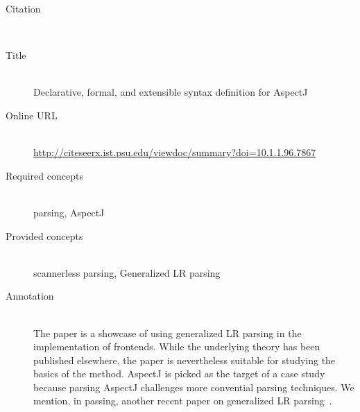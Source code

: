 \begin{description}
\item[Citation]\mbox{}\\
\cite{BravenboerTV06}
\item[Title]\mbox{}\\
Declarative, formal, and extensible syntax definition for AspectJ
\item[Online URL]\mbox{}\\
{\footnotesize\url{http://citeseerx.ist.psu.edu/viewdoc/summary?doi=10.1.1.96.7867}}
\item[Required concepts]\mbox{}\\
parsing, AspectJ\item[Provided concepts]\mbox{}\\
scannerless parsing, Generalized LR parsing\item[Annotation]\mbox{}\\
The paper is a showcase of using generalized LR parsing in the implementation of frontends. While the underlying theory has been published elsewhere, the paper is nevertheless suitable for studying the basics of the method. AspectJ is picked as the target of a case study because parsing AspectJ challenges more convential parsing techniques. We mention, in passing, another recent paper on generalized LR parsing~\cite{EconomopoulosKV09}.
\end{description}

